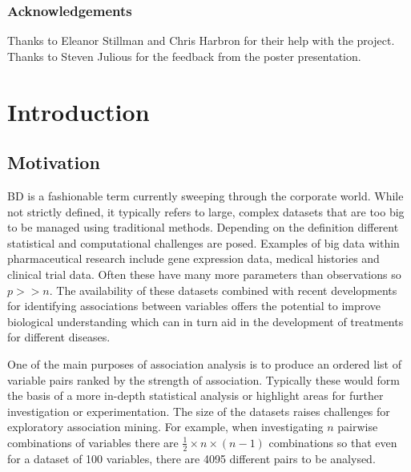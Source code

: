 \documentclass[a4paper, 12pt]{report}
\begin{document}
\newpage
\subsection*{Acknowledgements}
Thanks to Eleanor Stillman and Chris Harbron for their help with the project. Thanks to Steven Julious for the feedback from the poster presentation.  %

\tableofcontents{}
 
\chapter{Introduction}

\section{Motivation}
\gls{BD} is a fashionable term currently sweeping through the corporate world. While not strictly defined, it typically refers to large, complex datasets that are too big to be managed using traditional methods. Depending on the definition different statistical and computational challenges are posed. Examples of big data within pharmaceutical research include gene expression data, medical histories and clinical trial data. Often these have many more parameters than observations so $p >> n$. The availability of these datasets combined with recent developments for identifying associations between variables offers the potential to improve biological understanding which can in turn aid in the development of treatments for different diseases. 


One of the main purposes of association analysis is to produce an ordered list of variable pairs ranked by the strength of association. Typically these would form the basis of a more in-depth statistical analysis or highlight areas for further investigation or experimentation. The size of the datasets raises challenges for exploratory association mining. For example, when investigating $n$ pairwise combinations of variables there are $\frac{1}{2} \times n \times (n-1)$ combinations so that even for a dataset of 100 variables, there are 4095 different pairs to be analysed. 
\end{document}
